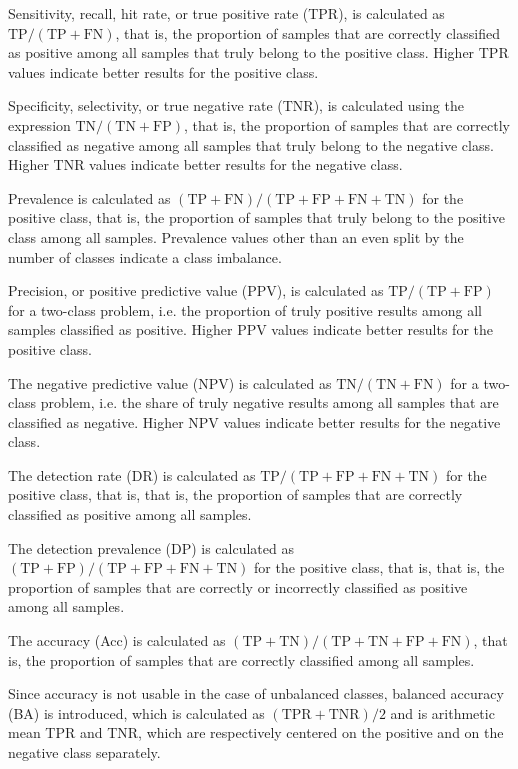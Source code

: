 \documentclass[preprint,12pt]{elsarticle}
\begin{document}
Sensitivity, recall, hit rate, or true positive rate (TPR), is calculated as $\mathrm{TP}/(\mathrm{TP}+\mathrm{FN})$, that is, the proportion of samples that are correctly classified as positive among all samples that truly belong to the positive class. Higher TPR values indicate better results for the positive class.

Specificity, selectivity, or true negative rate (TNR), is calculated using the expression $\mathrm{TN}/(\mathrm{TN}+\mathrm{FP})$, that is, the proportion of samples that are correctly classified as negative among all samples that truly belong to the negative class. Higher TNR values indicate better results for the negative class.

Prevalence is calculated as $(\mathrm{TP}+\mathrm{FN})/(\mathrm{TP}+\mathrm{FP}+\mathrm{FN}+\mathrm{TN})$ for the positive class, that is, the proportion of samples that truly belong to the positive class among all samples. Prevalence values other than an even split by the number of classes indicate a class imbalance.

Precision, or positive predictive value (PPV), is calculated as $\mathrm{TP}/(\mathrm{TP}+\mathrm{FP})$ for a two-class problem, i.e. the proportion of truly positive results among all samples classified as positive. 
Higher PPV values indicate better results for the positive class.

The negative predictive value (NPV) is calculated as $\mathrm{TN}/(\mathrm{TN}+\mathrm{FN})$ for a two-class problem, i.e. the share of truly negative results among all samples that are classified as negative. Higher NPV values indicate better results for the negative class.

The detection rate (DR) is calculated as $\mathrm{TP}/(\mathrm{TP}+\mathrm{FP}+\mathrm{FN}+\mathrm{TN})$ for the positive class, that is, that is, the proportion of samples that are correctly classified as positive among all samples.

The detection prevalence (DP) is calculated as $(\mathrm{TP}+\mathrm{FP})/(\mathrm{TP}+\mathrm{FP}+\mathrm{FN}+\mathrm{TN})$ for the positive class, that is, that is, the proportion of samples that are correctly or incorrectly classified as positive among all samples.

The accuracy (Acc) is calculated as $(\mathrm{TP} + \mathrm{TN}) / (\mathrm{TP} + \mathrm{TN} + \mathrm{FP} + \mathrm{FN})$, that is, the proportion of samples that are correctly classified among all samples.

Since accuracy is not usable in the case of unbalanced classes, balanced accuracy (BA) is introduced, which is calculated as $(\mathrm{TPR} + \mathrm{TNR}) / 2$ and is arithmetic mean TPR and TNR, which are respectively centered on the positive and on the negative class separately.
\end{document}
